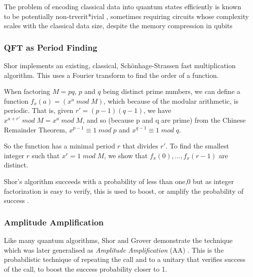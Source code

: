 The problem of encoding classical data into quantum states efficiently is known to be potentially non-trverit*ivial \cite{Tavakoli:2015}, 
sometimes requiring circuits whose complexity scales with the classical data size, despite the memory compression in qubits

\subsubsection{QFT as Period Finding}

Shor implements an existing, classical, Sch\"{o}nhage-Strassen fast multiplication algorithm.
This uses a Fourier transform  to find the order of a function.  

When factoring $M = pq$, $p$ and $q$ being distinct prime numbers,
we can define a function $f_x(a) = (x^a\;mod\;M)$, which because of the modular arithmetic, is periodic.
That is, given $r' = (p-1)(q-1)$, we have $x^{a+r'}\;mod\;M = x^a\;mod\;M$, and so (because p and q are prime)  
from the Chinese Remainder Theorem, $x^{p-1} \equiv 1\;mod\;p$ and  $x^{q-1} \equiv 1\;mod\;q$.

So the function has a minimal period $r$ that divides $r'$.  
To find the smallest integer $r$ such that $x^r = 1\;mod\;M$, 
we show that $f_x(0),..., f_x(r-1)$ are distinct.  

Shor's algorithm succeeds with a probability of less than one,0
but as integer factorization is easy to verify, this is used to boost, 
or amplify the probability of success \cite{Lipton:2021}.

\subsubsection{Amplitude Amplification}

Like many quantum algorithms, Shor and Grover demonstrate the technique which was later generalised as 
\emph{Amplitude Amplification} (AA) \cite{Dalzell:2023}.  This is the probabilistic technique of 
repeating the call and to a unitary that verifies success of the call, to boost the success probability
closer to 1.



